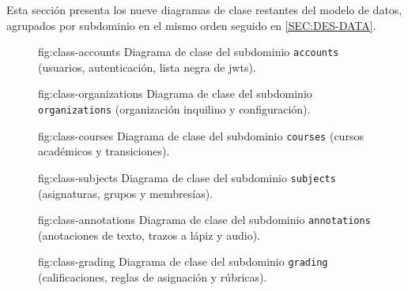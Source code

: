 Esta sección presenta los nueve diagramas de clase restantes del
modelo de datos, agrupados por subdominio en el mismo orden seguido
en \cref{SEC:DES-DATA}.

\begin{figure}[Diagrama de clase del subdominio \texttt{accounts}]%
              {fig:class-accounts}%
              {Diagrama de clase del subdominio \texttt{accounts}
               (usuarios, autenticación, lista negra de \acsp{jwt}).}
\end{figure}

\begin{figure}[Diagrama de clase del subdominio \texttt{organizations}]%
              {fig:class-organizations}%
              {Diagrama de clase del subdominio \texttt{organizations}
               (organización inquilino y configuración).}
\end{figure}

\begin{figure}[Diagrama de clase del subdominio \texttt{courses}]%
              {fig:class-courses}%
              {Diagrama de clase del subdominio \texttt{courses}
               (cursos académicos y transiciones).}
\end{figure}

\begin{figure}[Diagrama de clase del subdominio \texttt{subjects}]%
              {fig:class-subjects}%
              {Diagrama de clase del subdominio \texttt{subjects}
               (asignaturas, grupos y membresías).}
\end{figure}

\begin{figure}[Diagrama de clase del subdominio \texttt{annotations}]%
              {fig:class-annotations}%
              {Diagrama de clase del subdominio \texttt{annotations}
               (anotaciones de texto, trazos a lápiz y audio).}
\end{figure}

\begin{figure}[Diagrama de clase del subdominio \texttt{grading}]%
              {fig:class-grading}%
              {Diagrama de clase del subdominio \texttt{grading}
               (calificaciones, reglas de asignación y rúbricas).}
\end{figure}

